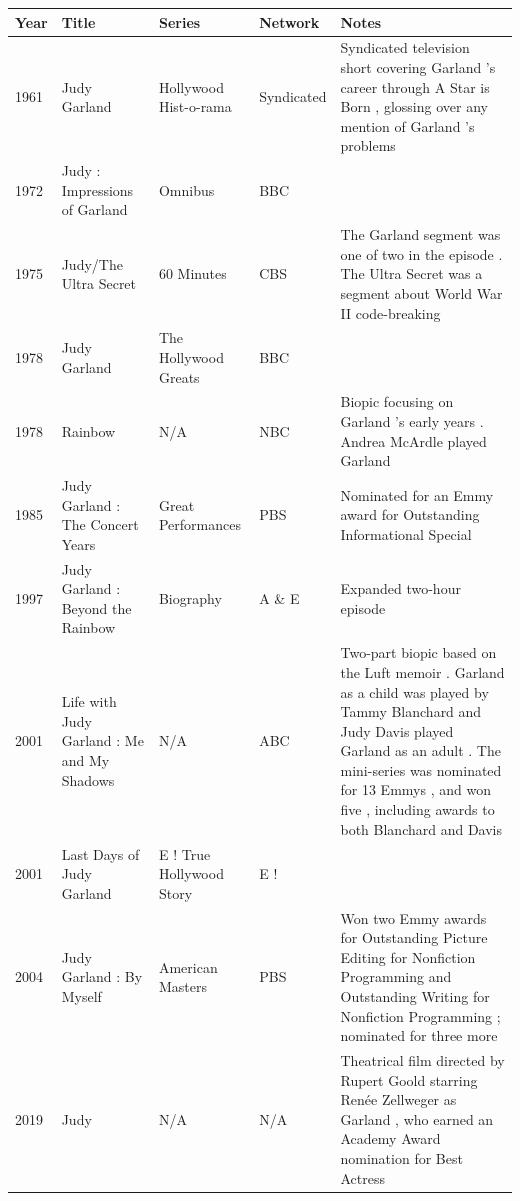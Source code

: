 \documentclass{article}
\begin{document}
\begin{tabular}{lllll}
\toprule
Year & Title & Series & Network & Notes \\
\midrule
1961 & Judy Garland & Hollywood Hist-o-rama & Syndicated & Syndicated television short covering Garland 's career through A Star is Born , glossing over any mention of Garland 's problems \\
1972 & Judy : Impressions of Garland & Omnibus & BBC &  \\
1975 & Judy/The Ultra Secret & 60 Minutes & CBS & The Garland segment was one of two in the episode . The Ultra Secret was a segment about World War II code-breaking \\
1978 & Judy Garland & The Hollywood Greats & BBC &  \\
1978 & Rainbow & N/A & NBC & Biopic focusing on Garland 's early years . Andrea McArdle played Garland \\
1985 & Judy Garland : The Concert Years & Great Performances & PBS & Nominated for an Emmy award for Outstanding Informational Special \\
1997 & Judy Garland : Beyond the Rainbow & Biography & A \& E & Expanded two-hour episode \\
2001 & Life with Judy Garland : Me and My Shadows & N/A & ABC & Two-part biopic based on the Luft memoir . Garland as a child was played by Tammy Blanchard and Judy Davis played Garland as an adult . The mini-series was nominated for 13 Emmys , and won five , including awards to both Blanchard and Davis \\
2001 & Last Days of Judy Garland & E ! True Hollywood Story & E ! &  \\
2004 & Judy Garland : By Myself & American Masters & PBS & Won two Emmy awards for Outstanding Picture Editing for Nonfiction Programming and Outstanding Writing for Nonfiction Programming ; nominated for three more \\
2019 & Judy & N/A & N/A & Theatrical film directed by Rupert Goold starring Renée Zellweger as Garland , who earned an Academy Award nomination for Best Actress \\
\bottomrule
\end{tabular}
\end{document}
